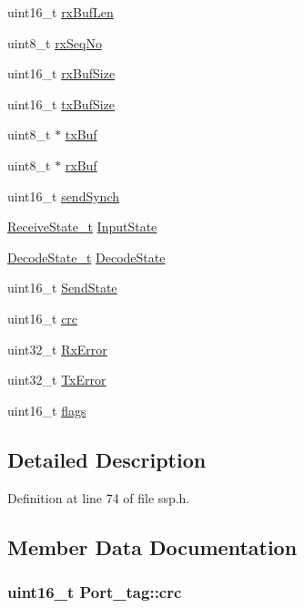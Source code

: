 \begin{DoxyCompactItemize}
uint16\-\_\-t \hyperlink{struct_port__tag_a2b8635d420232bc0f5d790760d65e34e}{rx\-Buf\-Len}
\item 
uint8\-\_\-t \hyperlink{struct_port__tag_a7a1772d5a99a1f86dacd3f04c7416e92}{rx\-Seq\-No}
\item 
uint16\-\_\-t \hyperlink{struct_port__tag_af09500b48a0a17a2ba95df22e44f0c06}{rx\-Buf\-Size}
\item 
uint16\-\_\-t \hyperlink{struct_port__tag_a42ed18a051e755953a8c5fab0542428d}{tx\-Buf\-Size}
\item 
uint8\-\_\-t $\ast$ \hyperlink{struct_port__tag_ad1f74dda7ace34ad1709c12bce475f29}{tx\-Buf}
\item 
uint8\-\_\-t $\ast$ \hyperlink{struct_port__tag_a6443695333cf60025e806731fbeb3ffa}{rx\-Buf}
\item 
uint16\-\_\-t \hyperlink{struct_port__tag_afb61302bc42bc58ea142b22b20374e85}{send\-Synch}
\item 
\hyperlink{ssp_8h_afb7fad58b6a4ede3367f53b8d1199eb5}{Receive\-State\-\_\-t} \hyperlink{struct_port__tag_a872ebb985531c08f3c00e12be31d101d}{Input\-State}
\item 
\hyperlink{ssp_8h_a8b75d84d7cd5a4e3fc100c5f3237a46a}{Decode\-State\-\_\-t} \hyperlink{struct_port__tag_a727523e48966489e2ee78510203f9ee7}{Decode\-State}
\item 
uint16\-\_\-t \hyperlink{struct_port__tag_a2a4b6bca783da837f9e0c32a84e99788}{Send\-State}
\item 
uint16\-\_\-t \hyperlink{struct_port__tag_a3de48e9d4e4aeb5fbbcd78ad0ab90cf4}{crc}
\item 
uint32\-\_\-t \hyperlink{struct_port__tag_aa25c893c348af3cfda6367dbc2de7961}{Rx\-Error}
\item 
uint32\-\_\-t \hyperlink{struct_port__tag_a99fba539f62c058a3625d7837ada4d85}{Tx\-Error}
\item 
uint16\-\_\-t \hyperlink{struct_port__tag_a3ba36252e483d133c896772fa60d8d56}{flags}
\end{DoxyCompactItemize}


\subsection{Detailed Description}


Definition at line 74 of file ssp.\-h.



\subsection{Member Data Documentation}
\hypertarget{struct_port__tag_a3de48e9d4e4aeb5fbbcd78ad0ab90cf4}{
\subsubsection[{crc}]{\setlength{\rightskip}{0pt plus 5cm}uint16\-\_\-t Port\-\_\-tag\-::crc}}\label{struct_port__tag_a3de48e9d4e4aeb5fbbcd78ad0ab90cf4}



